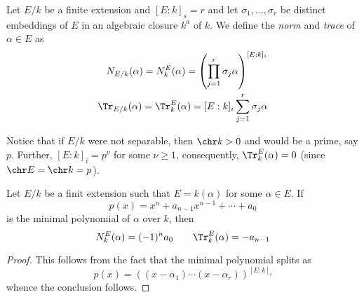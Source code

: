 \begin{definition}
    Let $E/k$ be a finite extension and $[E:k]_s = r$ and let $\sigma_1,\ldots,\sigma_r$ be distinct embeddings of $E$ in an algebraic closure $k^a$ of $k$. We define the \textit{norm} and \textit{trace} of $\alpha\in E$ as 
    \begin{align*}
        N_{E/k}(\alpha) = N^E_k(\alpha) = \left(\prod_{j = 1}^r\sigma_j\alpha\right)^{[E:k]_i}\\
        \Tr_{E/k}(\alpha) = \Tr^E_k(\alpha) = [E:k]_i\sum_{j = 1}^r\sigma_j\alpha
    \end{align*}
\end{definition}

Notice that if $E/k$ were not separable, then $\chr k > 0$ and would be a prime, say $p$. Further, $[E:k]_i = p^\nu$ for some $\nu\ge 1$, consequently, $\Tr^E_k(\alpha) = 0$ (since $\chr E = \chr k = p$).

\begin{proposition}
    Let $E/k$ be a finit extension such that $E = k(\alpha)$ for some $\alpha\in E$. If 
    \begin{equation*}
        p(x) = x^n + a_{n - 1}x^{n - 1} + \cdots + a_0
    \end{equation*}
    is the minimal polynomial of $\alpha$ over $k$, then 
    \begin{equation*}
        N^E_k(\alpha) = (-1)^na_0\qquad \Tr^E_k(\alpha) = -a_{n - 1}
    \end{equation*}
\end{proposition}
\begin{proof}
    This follows from the fact that the minimal polynomial splits as 
    \begin{equation*}
        p(x) = \left((x - \alpha_1)\cdots(x - \alpha_r)\right)^{[E:k]_i}
    \end{equation*}
    whence the conclusion follows.
\end{proof}

